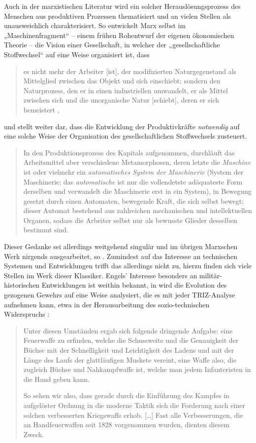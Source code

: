 \documentclass[12pt,a4paper]{article}
\begin{document}
Auch in der marxistischen Literatur wird ein solcher Herauslösungsprozess des
Menschen aus produktiven Prozessen thematisiert und an vielen Stellen als
unausweichlich charakterisiert.  So entwickelt Marx selbst im
„Maschinenfragment“ \cite[S. 570 ff.]{MEW42} -- einem frühen Rohentwurf der
eigenen ökonomischen Theorie -- die Vision einer Gesellschaft, in welcher der
„gesellschaftliche Stoffwechsel“ \cite[S. 37]{MEW23} auf eine Weise
organisiert ist, dass
\begin{quote}
  es nicht mehr der Arbeiter [ist], der modifizierten Naturgegenstand als
  Mittelglied zwischen das Objekt und sich einschiebt; sondern den
  Naturprozess, den er in einen industriellen umwandelt, er als Mittel
  zwischen sich und die unorganische Natur [schiebt], deren er sich
  bemeistert \cite[S. 572]{MEW42},
\end{quote}
und stellt weiter dar, dass die Entwicklung der Produktivkräfte
\emph{notwendig} auf eine solche Weise der Organisation des gesellschaftlichen
Stoffwechsels zusteuert.
\begin{quote}
  In den Produktionsprozess des Kapitals aufgenommen, durchläuft das
  Arbeitsmittel aber verschiedene Metamorphosen, deren letzte die
  \emph{Maschine} ist oder vielmehr ein \emph{automatisches System der
    Maschinerie} (System der Maschinerie; das \emph{automatische} ist nur die
  vollendetste adäquateste Form derselben und verwandelt die Maschinerie erst
  in ein System), in Bewegung gesetzt durch einen Automaten, bewegende Kraft,
  die sich selbst bewegt; dieser Automat bestehend aus zahlreichen mechanischen
  und intellektuellen Organen, sodass die Arbeiter selbst nur als bewusste
  Glieder desselben bestimmt sind. \cite[S. 584]{MEW42}
\end{quote}
Dieser Gedanke sei allerdings weitgehend singulär und im übrigen Marxschen
Werk nirgends ausgearbeitet, so \cite{Goldberg2016}. Zumindest auf das
Interesse an technischen Systemen und Entwicklungen trifft das allerdings
nicht zu, hierzu finden sich viele Stellen im Werk dieser Klassiker. Engels'
Interesse besonders an militär-historischen Entwicklungen ist weithin bekannt,
in \cite{MEW15} wird die Evolution des gezogenen Gewehrs auf eine Weise
analysiert, die es mit jeder TRIZ-Analyse aufnehmen kann, etwa in der
Herausarbeitung des sozio-technischen Widerspruchs \cite[S. 199]{MEW15}:
\begin{quote}
  Unter diesen Umständen ergab sich folgende dringende Aufgabe: eine
  Feuerwaffe zu erfinden, welche die Schussweite und die Genauigkeit der
  Büchse mit der Schnelligkeit und Leichtigkeit des Ladens und mit der Länge
  des Laufs der glattläufigen Muskete vereint, eine Waffe also, die zugleich
  Büchse und Nahkampfwaffe ist, welche man jedem Infanteristen in die Hand
  geben kann.

  So sehen wir also, dass gerade durch die Einführung des Kampfes in
  aufgelöster Ordnung in die moderne Taktik sich die Forderung nach einer
  solchen verbesserten Kriegswaffe erhob. [\ldots] Fast alle Verbesserungen,
  die an Handfeuerwaffen seit 1828 vorgenommen wurden, dienten diesem Zweck.
\end{quote}
\end{document}
